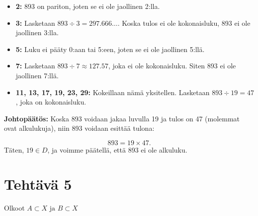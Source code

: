 \documentclass{article}
\begin{document}
\begin{itemize}
	\item \textbf{2:} 893 on pariton, joten se ei ole jaollinen 2:lla.
	\item \textbf{3:} Lasketaan \(893 \div 3 = 297.666\ldots\). Koska tulos ei ole kokonaisluku, 893 ei ole jaollinen 3:lla.
	\item \textbf{5:} Luku ei pääty 0:aan tai 5:een, joten se ei ole jaollinen 5:llä.
	\item \textbf{7:} Lasketaan \(893 \div 7 \approx 127.57\), joka ei ole kokonaisluku. Siten 893 ei ole jaollinen 7:llä.
	\item \textbf{11, 13, 17, 19, 23, 29:} Kokeillaan nämä yksitellen. Lasketaan \(893 \div 19 = 47\), joka on kokonaisluku.
\end{itemize}
\textbf{Johtopäätös:}
\newline
Koska 893 voidaan jakaa luvulla 19 ja tulos on 47 (molemmat ovat alkulukuja), niin 893 voidaan esittää tulona:

\[
893 = 19 \times 47.
\]
\newline
Täten, \(19 \in D\), ja voimme päätellä, että 893 ei ole alkuluku.


\newpage


\section*{Tehtävä 5}

Olkoot \(A \subset X \text{ ja } B \subset X\)
\end{document}
